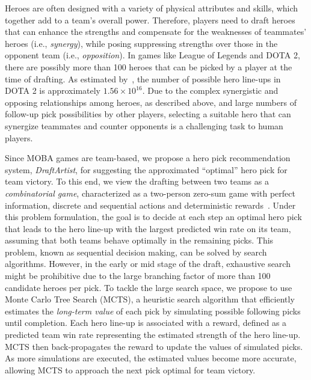 Heroes are often designed with a variety of physical attributes and skills, which together add to a team's overall power. Therefore, players need to draft heroes that can enhance the strengths and compensate for the weaknesses of teammates' heroes (i.e., \textit{synergy}), while posing suppressing strengths over those in the opponent team (i.e., \textit{opposition}). In games like League of Legends and DOTA 2, there are possibly more than 100 heroes that can be picked by a player at the time of drafting. As estimated by~\cite{hanke2017reco}, the number of possible hero line-ups in DOTA 2 is approximately $1.56 \times 10^{16}$. Due to the complex synergistic and opposing relationships among heroes, as described above, and large numbers of follow-up pick possibilities by other players, selecting a suitable hero that can synergize teammates and counter opponents is a challenging task to human players. 


Since MOBA games are team-based, we propose a hero pick recommendation system, \textit{DraftArtist}, for suggesting the approximated ``optimal'' hero pick for team victory. To this end, we view the drafting between two teams as a \textit{combinatorial game}, characterized as a two-person zero-sum game with perfect information, discrete and sequential actions and deterministic rewards~\cite{browne2012survey}. Under this problem formulation, the goal is to decide at each step an optimal hero pick that leads to the hero line-up with the largest predicted win rate on its team, assuming that both teams behave optimally in the remaining picks. This problem, known as sequential decision making, can be solved by search algorithms. However, in the early or mid stage of the draft, exhaustive search might be prohibitive due to the large branching factor of more than 100 candidate heroes per pick. To tackle the large search space, we propose to use Monte Carlo Tree Search (MCTS), a heuristic search algorithm that efficiently estimates the \textit{long-term value} of each pick by simulating possible following picks until completion. Each hero line-up is associated with a reward, defined as a predicted team win rate representing the estimated strength of the hero line-up. MCTS then back-propagates the reward to update the values of simulated picks. As more simulations are executed, the estimated values become more accurate, allowing MCTS to approach the next pick optimal for team victory. 

